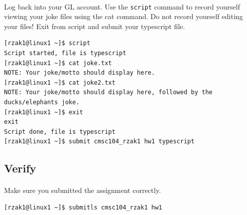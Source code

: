 \documentclass[letter,11pt]{article}
\begin{document}
\paragraph{}Log back into your GL account. Use the \texttt{script} command to record yourself viewing your joke files using the cat command. Do not record yourself editing your files! Exit from script and submit your typescript file.
\begin{verbatim}
[rzak1@linux1 ~]$ script
Script started, file is typescript
[rzak1@linux1 ~]$ cat joke.txt
NOTE: Your joke/motto should display here.
[rzak1@linux1 ~]$ cat joke2.txt
NOTE: Your joke/motto should display here, followed by the ducks/elephants joke.
[rzak1@linux1 ~]$ exit
exit
Script done, file is typescript
[rzak1@linux1 ~]$ submit cmsc104_rzak1 hw1 typescript
\end{verbatim}

\newpage
\subsection*{Verify}
\paragraph{}Make sure you submitted the assignment correctly.
\begin{verbatim}
[rzak1@linux1 ~]$ submitls cmsc104_rzak1 hw1
\end{verbatim}
\end{document}
